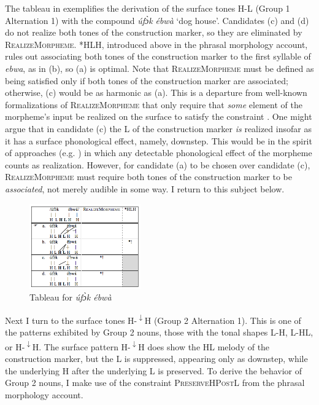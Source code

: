 \documentclass[output=paper]{langscibook}
\begin{document}
The tableau in  exemplifies the derivation of the surface tones H-L (Group 1 Alternation 1) with the compound \textit{úfɔ̀k} \textit{ébwà} ‘dog house’. Candidates (c) and (d) do not realize both tones of the construction marker, so they are eliminated by \textsc{RealizeMorpheme}. *HLH, introduced above in the phrasal morphology account, rules out associating both tones of the construction marker to the first syllable of \textit{ebwa}, as in (b), so (a) is optimal. Note that \textsc{RealizeMorpheme} must be defined as being satisfied only if both tones of the construction marker are associated; otherwise, (c) would be as harmonic as (a). This is a departure from well-known formalizations of \textsc{RealizeMorpheme} that only require that \textit{some} element of the morpheme’s input be realized on the surface to satisfy the constraint \citep{Gnanadesikan1997,Oostendorp2005}. One might argue that in candidate (c) the L of the construction marker \textit{is} realized insofar as it has a surface phonological effect, namely, downstep. This would be in the spirit of approaches (e.g. \citealt{Gnanadesikan1997}) in which any detectable phonological effect of the morpheme counts as realization. However, for candidate (a) to be chosen over candidate (c), \textsc{RealizeMorpheme} must require both tones of the construction marker to be \textit{associated}, not merely audible in some way. I return to this subject below.\largerpage

\begin{figure}
\includegraphics[width=48mm]{figures/glewwe-img6.png}
\caption{Tableau for \textit{úfɔ̀k ébwà}}
\label{fig:glewwe:7}
\end{figure}

Next I turn to the surface tones H-\textsuperscript{$\downarrow$}H (Group 2 Alternation 1). This is one of the patterns exhibited by Group 2 nouns, those with the tonal shapes L-H, L-HL, or H-\textsuperscript{$\downarrow$}H. The surface pattern H-\textsuperscript{$\downarrow$}H does show the HL melody of the construction marker, but the L is suppressed, appearing only as downstep, while the underlying H after the underlying L is preserved. To derive the behavior of Group 2 nouns, I make use of the constraint \textsc{PreserveHPostL} from the phrasal morphology account. 
\end{document}
